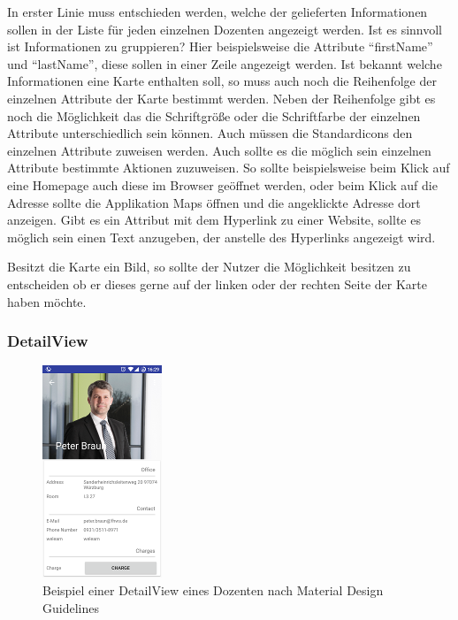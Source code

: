 In erster Linie muss entschieden werden, welche der gelieferten Informationen sollen in der Liste für jeden einzelnen Dozenten angezeigt werden. Ist es sinnvoll ist Informationen zu gruppieren? Hier beispielsweise die Attribute \enquote{firstName} und \enquote{lastName}, diese sollen in einer Zeile angezeigt werden. Ist bekannt welche Informationen eine Karte enthalten soll, so muss auch noch die Reihenfolge der einzelnen Attribute der Karte bestimmt werden.
Neben der Reihenfolge gibt es noch die Möglichkeit das die Schriftgröße oder die Schriftfarbe der einzelnen Attribute unterschiedlich sein können. Auch müssen die Standardicons den einzelnen Attribute zuweisen werden. Auch sollte es die möglich sein einzelnen Attribute bestimmte Aktionen zuzuweisen. So sollte beispielsweise beim Klick auf eine Homepage auch diese im Browser geöffnet werden, oder beim Klick auf die Adresse sollte die Applikation Maps öffnen und die angeklickte Adresse dort anzeigen. Gibt es ein Attribut mit dem Hyperlink zu einer Website, sollte es möglich sein einen Text anzugeben, der anstelle des Hyperlinks angezeigt wird. 

Besitzt die Karte ein Bild, so sollte der Nutzer die Möglichkeit besitzen zu entscheiden ob er dieses gerne auf der linken oder der rechten Seite der Karte haben möchte.

\subsubsection{DetailView}

\begin{figure}[H]
	\begin{center}
		\includegraphics{images/detail.png}
		\caption{Beispiel einer DetailView eines Dozenten nach Material Design Guidelines}
		\label{fig:detail}
	\end{center}
\end{figure}

